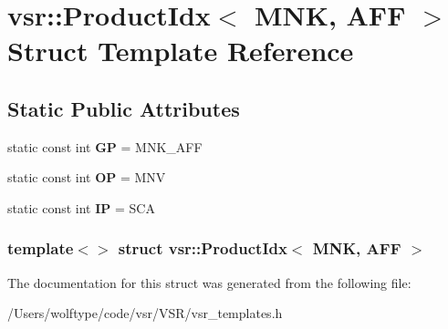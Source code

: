 \hypertarget{structvsr_1_1_product_idx_3_01_m_n_k_00_01_a_f_f_01_4}{\section{vsr\-:\-:Product\-Idx$<$ M\-N\-K, A\-F\-F $>$ Struct Template Reference}
\label{structvsr_1_1_product_idx_3_01_m_n_k_00_01_a_f_f_01_4}
}
\subsection*{Static Public Attributes}
\begin{DoxyCompactItemize}
\item 
\hypertarget{structvsr_1_1_product_idx_3_01_m_n_k_00_01_a_f_f_01_4_a6998a576bdfc74c7f42ca7b6f4c17c19}{static const int {\bfseries G\-P} = M\-N\-K\-\_\-\-A\-F\-F}\label{structvsr_1_1_product_idx_3_01_m_n_k_00_01_a_f_f_01_4_a6998a576bdfc74c7f42ca7b6f4c17c19}

\item 
\hypertarget{structvsr_1_1_product_idx_3_01_m_n_k_00_01_a_f_f_01_4_a8f3f03cf57796586b8f68d8fd7c997e2}{static const int {\bfseries O\-P} = M\-N\-V}\label{structvsr_1_1_product_idx_3_01_m_n_k_00_01_a_f_f_01_4_a8f3f03cf57796586b8f68d8fd7c997e2}

\item 
\hypertarget{structvsr_1_1_product_idx_3_01_m_n_k_00_01_a_f_f_01_4_a8c6ebc5c6ae81ab44c9a16228968c383}{static const int {\bfseries I\-P} = S\-C\-A}\label{structvsr_1_1_product_idx_3_01_m_n_k_00_01_a_f_f_01_4_a8c6ebc5c6ae81ab44c9a16228968c383}

\end{DoxyCompactItemize}
\subsubsection*{template$<$$>$ struct vsr\-::\-Product\-Idx$<$ M\-N\-K, A\-F\-F $>$}



The documentation for this struct was generated from the following file\-:\begin{DoxyCompactItemize}
\item 
/\-Users/wolftype/code/vsr/\-V\-S\-R/vsr\-\_\-templates.\-h\end{DoxyCompactItemize}
